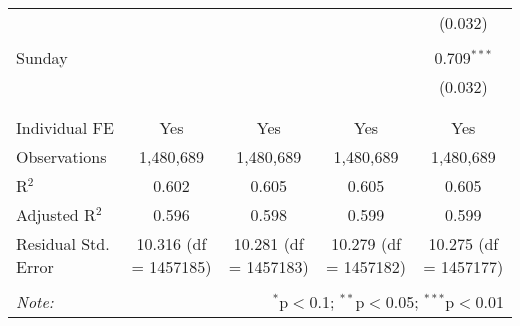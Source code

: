 \documentclass[
]{article}
\begin{document}
\begin{table}[!htbp]
{\begin{tabular}{@{\extracolsep{5pt}}lcccc}
  &  &  &  & (0.032) \\ 
  & & & & \\ 
 Sunday &  &  &  & 0.709$^{***}$ \\ 
  &  &  &  & (0.032) \\ 
  & & & & \\ 
\hline \\[-1.8ex] 
Individual FE & Yes & Yes & Yes & Yes \\ 
Observations & 1,480,689 & 1,480,689 & 1,480,689 & 1,480,689 \\ 
R$^{2}$ & 0.602 & 0.605 & 0.605 & 0.605 \\ 
Adjusted R$^{2}$ & 0.596 & 0.598 & 0.599 & 0.599 \\ 
Residual Std. Error & 10.316 (df = 1457185) & 10.281 (df = 1457183) & 10.279 (df = 1457182) & 10.275 (df = 1457177) \\ 
\hline 
\hline \\[-1.8ex] 
\textit{Note:}  & \multicolumn{4}{r}{$^{*}$p$<$0.1; $^{**}$p$<$0.05; $^{***}$p$<$0.01} \\ 
\end{tabular}
} 
\end{table} 
\newpage
\end{document}
